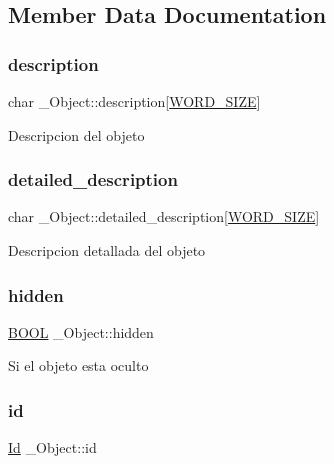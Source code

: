 \subsection{Member Data Documentation}
\mbox{\label{struct__Object_a556e2e37c1461bcaae6492d2101f407d}} 
\subsubsection{\texorpdfstring{description}{description}}
{\footnotesize\ttfamily char \+\_\+\+Object\+::description\mbox{[}\hyperlink{types_8h_a92ed8507d1cd2331ad09275c5c4c1c89}{W\+O\+R\+D\+\_\+\+S\+I\+ZE}\mbox{]}}

Descripcion del objeto \mbox{\label{struct__Object_a845f937720e152021135cb3ddbd21b05}} 
\subsubsection{\texorpdfstring{detailed\+\_\+description}{detailed\_description}}
{\footnotesize\ttfamily char \+\_\+\+Object\+::detailed\+\_\+description\mbox{[}\hyperlink{types_8h_a92ed8507d1cd2331ad09275c5c4c1c89}{W\+O\+R\+D\+\_\+\+S\+I\+ZE}\mbox{]}}

Descripcion detallada del objeto \mbox{\label{struct__Object_a44824966fc9f4d5f82c189b2e063ddc4}} 
\subsubsection{\texorpdfstring{hidden}{hidden}}
{\footnotesize\ttfamily \hyperlink{types_8h_a3e5b8192e7d9ffaf3542f1210aec18dd}{B\+O\+OL} \+\_\+\+Object\+::hidden}

Si el objeto esta oculto \mbox{\label{struct__Object_a3cff7a0e8dc4e9d23895ed9af1b7653a}} 
\subsubsection{\texorpdfstring{id}{id}}
{\footnotesize\ttfamily \hyperlink{types_8h_a845e604fb28f7e3d97549da3448149d3}{Id} \+\_\+\+Object\+::id}

